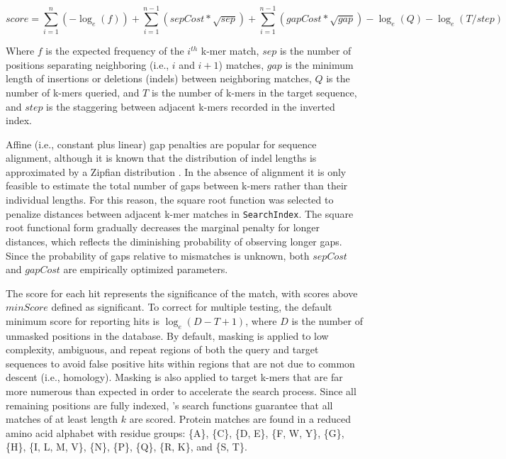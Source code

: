 \[score = \sum_{i=1}^{n}(-\log_e(f)) + \sum_{i=1}^{n-1}(sepCost*\sqrt{sep}) + \sum_{i=1}^{n-1}(gapCost*\sqrt{gap}) - \log_e(Q) - \log_e(T/step)\]

Where \(f\) is the expected frequency of the \(i^{th}\) k-mer match, \(sep\) is the number of positions separating neighboring (i.e., \(i\) and \(i + 1\)) matches, \(gap\) is the minimum length of insertions or deletions (indels) between neighboring matches, \(Q\) is the number of k-mers queried, and \(T\) is the number of k-mers in the target sequence, and \(step\) is the staggering between adjacent k-mers recorded in the inverted index.

Affine (i.e., constant plus linear) gap penalties are popular for sequence alignment, although it is known that the distribution of indel lengths is approximated by a Zipfian distribution \citep{RN4262}. In the absence of alignment it is only feasible to estimate the total number of gaps between k-mers rather than their individual lengths. For this reason, the square root function was selected to penalize distances between adjacent k-mer matches in \texttt{SearchIndex}. The square root functional form gradually decreases the marginal penalty for longer distances, which reflects the diminishing probability of observing longer gaps. Since the probability of gaps relative to mismatches is unknown, both \(sepCost\) and \(gapCost\) are empirically optimized parameters.

The score for each hit represents the significance of the match, with scores above \(minScore\) defined as significant. To correct for multiple testing, the default minimum score for reporting hits is \(\log_e(D - T + 1)\), where \(D\) is the number of unmasked positions in the database. By default, masking is applied to low complexity, ambiguous, and repeat regions of both the query and target sequences to avoid false positive hits within regions that are not due to common descent (i.e., homology). Masking is also applied to target k-mers that are far more numerous than expected in order to accelerate the search process. Since all remaining positions are fully indexed, 's search functions guarantee that all matches of at least length \(k\) are scored. Protein matches are found in a reduced amino acid alphabet with residue groups: \{A\}, \{C\}, \{D, E\}, \{F, W, Y\}, \{G\}, \{H\}, \{I, L, M, V\}, \{N\}, \{P\}, \{Q\}, \{R, K\}, and \{S, T\}.

